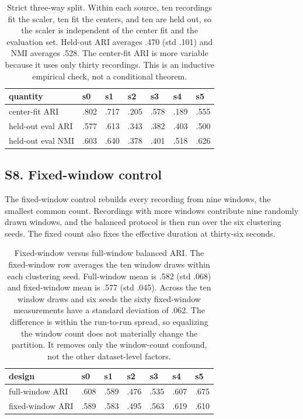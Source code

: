 \begin{table}[H]
\centering
\footnotesize
\caption{Strict three-way split. Within each source, ten recordings fit the scaler, ten fit the centers, and ten are held out, so the scaler is independent of the center fit and the evaluation set. Held-out ARI averages .470 (std .101) and NMI averages .528. The center-fit ARI is more variable because it uses only thirty recordings. This is an inductive empirical check, not a conditional theorem.}
\label{tab:threeway}
\begin{tabular}{lllllll}
\hline
quantity & s0 & s1 & s2 & s3 & s4 & s5\\
\hline
center-fit ARI & .802 & .717 & .205 & .578 & .189 & .555\\
held-out eval ARI & .577 & .613 & .343 & .382 & .403 & .500\\
held-out eval NMI & .603 & .640 & .378 & .401 & .518 & .626\\
\hline
\end{tabular}

\end{table}

\subsection{S8. Fixed-window control}\label{s8.-fixed-window-control}

The fixed-window control rebuilds every recording from nine windows, the
smallest common count. Recordings with more windows contribute nine
randomly drawn windows, and the balanced protocol is then run over the
six clustering seeds. The fixed count also fixes the effective duration
at thirty-six seconds.

\begin{table}[H]
\centering
\footnotesize
\caption{Fixed-window versus full-window balanced ARI. The fixed-window row averages the ten window draws within each clustering seed. Full-window mean is .582 (std .068) and fixed-window mean is .577 (std .045). Across the ten window draws and six seeds the sixty fixed-window measurements have a standard deviation of .062. The difference is within the run-to-run spread, so equalizing the window count does not materially change the partition. It removes only the window-count confound, not the other dataset-level factors.}
\label{tab:fixedwindow}
\begin{tabular}{lllllll}
\hline
design & s0 & s1 & s2 & s3 & s4 & s5\\
\hline
full-window ARI & .608 & .589 & .476 & .535 & .607 & .675\\
fixed-window ARI & .589 & .583 & .495 & .563 & .619 & .610\\
\hline
\end{tabular}

\end{table}


